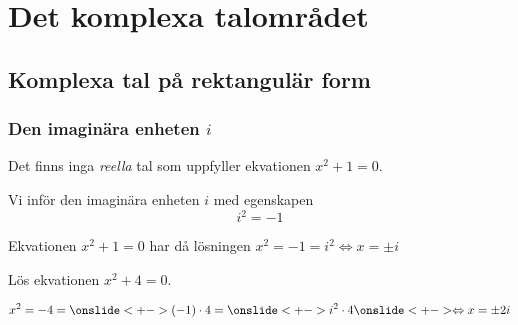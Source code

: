 \documentclass[slidestop,blue,handout,9pt]{beamer}
\begin{document}
 

\begin{frame}[plain]
  \titlepage
\end{frame}

\section{Det komplexa talområdet} 
\subsection{Komplexa tal på rektangulär form}

\begin{frame}
\frametitle{Den imaginära enheten $i$}
\pause
Det finns inga \emph{reella} tal som uppfyller ekvationen $x^{2}+1=0$.
\onslide<+->
\begin{center}
\begin{minipage}{0.78\textwidth}
\begin{varblock}[0.8\textwidth]{}
Vi inför den \alert{imaginära enheten $i$} med egenskapen 
\[ 
i^2 = -1 
\]
\end{varblock}
\end{minipage}
\end{center}
\onslide<+->
Ekvationen $x^ 2 + 1 = 0$ har då lösningen $x^2 = -1 = i^2 \Leftrightarrow x = \pm i$\\
\begin{exempel}
Lös ekvationen $x^2 + 4 = 0$.
\onslide<+->
\begin{losning} 
\[
x^2 = -4 = \onslide<+-> (-1)\cdot 4 = \onslide<+-> i^2\cdot 4 
\onslide<+-> \Leftrightarrow x = \pm 2i
\]
\end{losning}
\end{exempel}
\end{frame}
 
\end{document}
